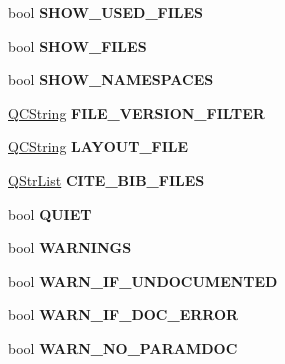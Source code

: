 \begin{DoxyCompactItemize}
bool {\bfseries S\+H\+O\+W\+\_\+\+U\+S\+E\+D\+\_\+\+F\+I\+L\+ES}
\item 
\mbox{\label{class_config_values_ac2be32e9a90c4c198b834441d4d94445}} 
bool {\bfseries S\+H\+O\+W\+\_\+\+F\+I\+L\+ES}
\item 
\mbox{\label{class_config_values_acd491422f4488ca3d7957854444be379}} 
bool {\bfseries S\+H\+O\+W\+\_\+\+N\+A\+M\+E\+S\+P\+A\+C\+ES}
\item 
\mbox{\label{class_config_values_abb34b741c35e45fa1e2103932e108ac6}} 
\mbox{\hyperlink{class_q_c_string}{Q\+C\+String}} {\bfseries F\+I\+L\+E\+\_\+\+V\+E\+R\+S\+I\+O\+N\+\_\+\+F\+I\+L\+T\+ER}
\item 
\mbox{\label{class_config_values_ab331f540ba66ac7ff1d6f8f1c8486b31}} 
\mbox{\hyperlink{class_q_c_string}{Q\+C\+String}} {\bfseries L\+A\+Y\+O\+U\+T\+\_\+\+F\+I\+LE}
\item 
\mbox{\label{class_config_values_a21007a113c54dbf1093febc47645f61e}} 
\mbox{\hyperlink{class_q_str_list}{Q\+Str\+List}} {\bfseries C\+I\+T\+E\+\_\+\+B\+I\+B\+\_\+\+F\+I\+L\+ES}
\item 
\mbox{\label{class_config_values_adbf2428955cdac99299c981970016c8f}} 
bool {\bfseries Q\+U\+I\+ET}
\item 
\mbox{\label{class_config_values_ae1c2ac21681a1ba10207308dd6abb89f}} 
bool {\bfseries W\+A\+R\+N\+I\+N\+GS}
\item 
\mbox{\label{class_config_values_ac01215336a42df194bf4ad20fa127f9c}} 
bool {\bfseries W\+A\+R\+N\+\_\+\+I\+F\+\_\+\+U\+N\+D\+O\+C\+U\+M\+E\+N\+T\+ED}
\item 
\mbox{\label{class_config_values_a814a1a3dbeb66f3e74423d45eb7ce810}} 
bool {\bfseries W\+A\+R\+N\+\_\+\+I\+F\+\_\+\+D\+O\+C\+\_\+\+E\+R\+R\+OR}
\item 
\mbox{\label{class_config_values_a5511e201b4471279723e1254b5d01bc8}} 
bool {\bfseries W\+A\+R\+N\+\_\+\+N\+O\+\_\+\+P\+A\+R\+A\+M\+D\+OC}

\end{DoxyCompactItemize}
